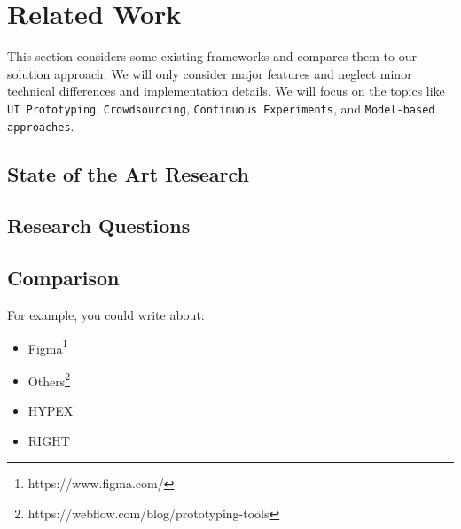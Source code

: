 \chapter{Related Work} \label{chap:csr}

This section considers some existing frameworks and compares them to our solution approach. 
We will only consider major features and neglect minor technical differences and implementation details. 
We will focus on the topics like \texttt{UI Prototyping}, \texttt{Crowdsourcing}, \texttt{Continuous Experiments}, and \texttt{Model-based approaches}. 

\section{State of the Art Research}
\section{Research Questions}
\section{Comparison}

For example, you could write about: 
\begin{itemize}
	\item Figma\footnote{https://www.figma.com/}
	\item Others\footnote{https://webflow.com/blog/prototyping-tools} 	
	\item HYPEX \cite{article:hypex:model}
	\item RIGHT \cite{article:right:model}
\end{itemize}